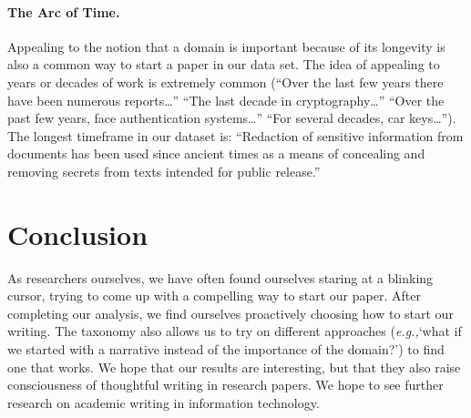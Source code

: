 \documentclass[sigconf,anonymous]{acmart}
\newcommand{\eg}{\textit{e.g.,}\xspace}
\begin{document}
\paragraph{The Arc of Time.} Appealing to the notion that a domain is important because of its longevity is also a common way to start a paper in our data set. The idea of appealing to years or decades of work is extremely common (``Over the last few years there have been numerous reports…'' ``The last decade in cryptography…'' ``Over the past few years, face authentication systems…'' ``For several decades, car keys…''). The longest timeframe in our dataset is: ``Redaction of sensitive information from documents has been used since ancient times as a means of concealing and removing secrets from texts intended for public release.''

\section{Conclusion}

As researchers ourselves, we have often found ourselves staring at a blinking cursor, trying to come up with a compelling way to start our paper. After completing our analysis, we find ourselves proactively choosing how to start our writing. The taxonomy also allows us to try on different approaches (\eg `what if we started with a narrative instead of the importance of the domain?') to find one that works. We hope that our results are interesting, but that they also raise consciousness of thoughtful writing in research papers. We hope to see further research on academic writing in information technology. 
	


\end{document}
